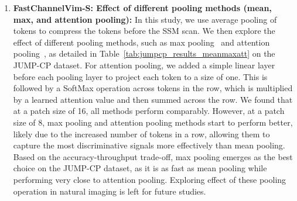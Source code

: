 \begin{enumerate}
\item  \textbf{FastChannelVim-S: Effect of different pooling methods (mean, max, and attention pooling):} In this study, we use average pooling of tokens to compress the tokens before the SSM scan. We then explore the effect of different pooling methods, such as max pooling~\cite{ranasinghe2023perceptual} and attention pooling~\cite{abmil}, as detailed in Table~\ref{tab:jumpcp_results_meanmaxatt} on the JUMP-CP dataset. For attention pooling, we added a simple linear layer before each pooling layer to project each token to a size of one. This is followed by a SoftMax operation across tokens in the row, which is multiplied by a learned attention value and then summed across the row. We found that at a patch size of 16, all methods perform comparably. However, at a patch size of 8, max pooling and attention pooling methods start to perform better, likely due to the increased number of tokens in a row, allowing them to capture the most discriminative signals more effectively than mean pooling. Based on the accuracy-throughput trade-off, max pooling emerges as the best choice on the JUMP-CP dataset, as it is as fast as mean pooling while performing very close to attention pooling. Exploring effect of these pooling operation in natural imaging is left for future studies. 
\\

\begin{table}[!h]
    \caption{FastChannelVim-S: Effect of different pooling methods (mean, max, and attention pooling) on 160-way perturbed gene prediction on JUMP-CP dataset. All methods use hierarchical channel sampling~\cite{channelvit} for training, and testing is done using all 8 channels. Each cell image is of resolution $224 \times 224 \times 8$.}
    \begin{center}
\end{center}
\end{table}
\end{enumerate}
